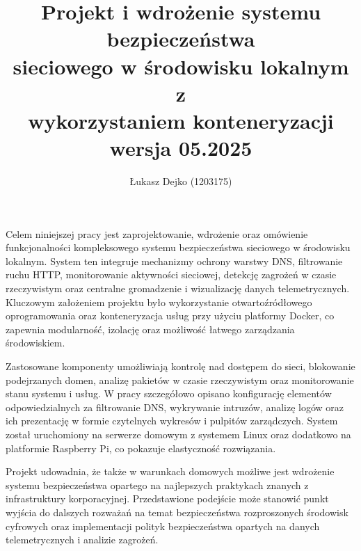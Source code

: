 \documentclass[
    left=2.5cm,         %
    right=2.5cm,        %
    top=2.5cm,          %
    bottom=3cm,         %
    bindingoffset=6mm,  %
    nohyphenation=true %
]{eiti/eiti-thesis} %
\begin{document}
\EngineerThesis
{}

\title{
    Projekt i wdrożenie systemu bezpieczeństwa \\ 
    sieciowego w środowisku lokalnym z \\
    wykorzystaniem konteneryzacji \\
    wersja 05.2025
}


\author{Łukasz Dejko (1203175)}


\date{\the\year}
\maketitle

\streszczenie Celem niniejszej pracy jest zaprojektowanie, wdrożenie oraz omówienie funkcjonalności kompleksowego systemu bezpieczeństwa sieciowego w środowisku lokalnym. System ten integruje mechanizmy ochrony warstwy DNS, filtrowanie ruchu HTTP, monitorowanie aktywności sieciowej, detekcję zagrożeń w czasie rzeczywistym oraz centralne gromadzenie i wizualizację danych telemetrycznych. Kluczowym założeniem projektu było wykorzystanie otwartoźródłowego oprogramowania oraz konteneryzacja usług przy użyciu platformy Docker, co zapewnia modularność, izolację oraz możliwość łatwego zarządzania środowiskiem.

Zastosowane komponenty umożliwiają kontrolę nad dostępem do sieci, blokowanie podejrzanych domen, analizę pakietów w czasie rzeczywistym oraz monitorowanie stanu systemu i usług. W pracy szczegółowo opisano konfigurację elementów odpowiedzialnych za filtrowanie DNS, wykrywanie intruzów, analizę logów oraz ich prezentację w formie czytelnych wykresów i pulpitów zarządczych. System został uruchomiony na serwerze domowym z systemem Linux oraz dodatkowo na platformie Raspberry Pi, co pokazuje elastyczność rozwiązania.

Projekt udowadnia, że także w warunkach domowych możliwe jest wdrożenie systemu bezpieczeństwa opartego na najlepszych praktykach znanych z infrastruktury korporacyjnej. Przedstawione podejście może stanowić punkt wyjścia do dalszych rozważań na temat bezpieczeństwa rozproszonych środowisk cyfrowych oraz implementacji polityk bezpieczeństwa opartych na danych telemetrycznych i analizie zagrożeń.
\end{document}
